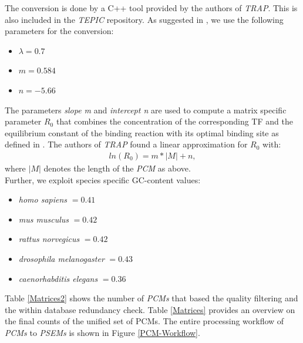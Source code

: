 \documentclass{article}
\begin{document}
The conversion is done by a C++ tool provided by the authors of \textit{TRAP}. This is also included in the \textit{TEPIC} repository.
As suggested in \cite{pmid17098775}, we use the following parameters for the conversion:
\begin{itemize}
\item $\lambda=0.7$
\item $m=0.584$
\item $n=-5.66$
\end{itemize}
The parameters \textit{slope m} and \textit{intercept n} are used to compute a matrix specific parameter $R_0$ that combines the concentration of the corresponding TF and the
equilibrium constant of the binding reaction with its optimal binding site as defined in \cite{pmid17098775}. The authors of \textit{TRAP} found a linear approximation for $R_0$ with:
\begin{align}
ln(R_0)=m*|M|+n,
\end{align}
where $|M|$ denotes the length of the \textit{PCM} as above.
\bigskip
\\Further, we exploit species specific GC-content values:
\begin{itemize}
\item \textit{homo sapiens }$=0.41$
\item \textit{mus musculus }$=0.42$
\item \textit{rattus norvegicus }$=0.42$
\item \textit{drosophila melanogaster }$=0.43$
\item \textit{caenorhabditis elegans }$=0.36$
\end{itemize}
Table \ref{Matrices2} shows the number of \textit{PCMs} that based the quality filtering and the within database redundancy check. 
Table \ref{Matrices} provides an overview on the final counts of the unified set of PCMs.
The entire processing workflow of \textit{PCMs} to \textit{PSEMs} is shown in Figure \ref{PCM-Workflow}.
\end{document}
